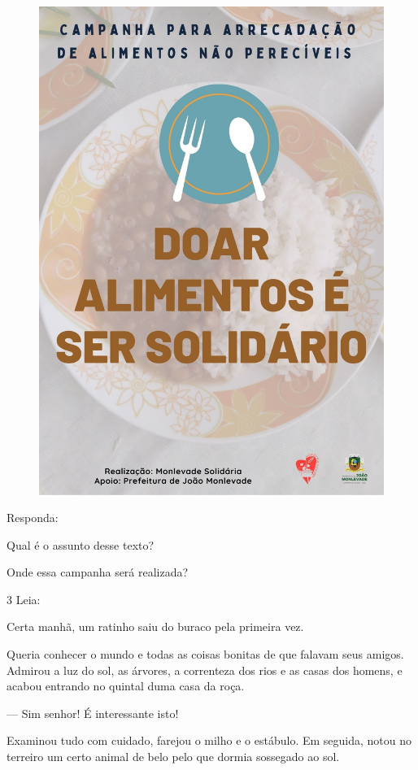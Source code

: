 \begin{figure}[H]
\centering
\includegraphics[width=.75\textwidth]{media/image119.jpeg}
\end{figure}


Responda:

\begin{escolha}
\item Qual é o assunto desse texto?


\item Onde essa campanha será realizada?

\end{escolha}

\num{3} Leia:


\begin{myquote}
Certa manhã, um ratinho saiu do buraco pela primeira vez.

Queria conhecer o mundo e todas as coisas bonitas de que
falavam seus amigos. Admirou a luz do sol, as árvores, a
correnteza dos rios e as casas dos homens, e acabou entrando no
quintal duma casa da roça.

--- Sim senhor! É interessante isto!

Examinou tudo com cuidado, farejou o milho e o estábulo.
Em seguida, notou no terreiro um certo animal de belo pelo que dormia
sossegado ao sol.

\end{myquote}

